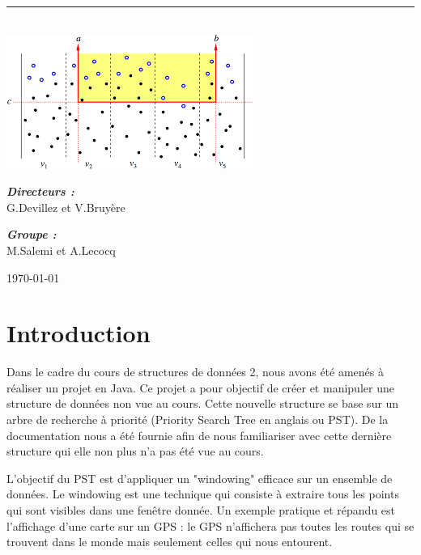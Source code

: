 \documentclass[10pt,a4paper]{article}
\newcommand{\HRule}{\rule{\linewidth}{0.5mm}}
\begin{document}
\begin{titlepage}
\begin{sffamily}
\begin{center}
    \HRule \\[2cm]
    \includegraphics[scale=0.50]{images/window.png}
    \\[2cm]

    \begin{minipage}{0.4\textwidth}
      \begin{flushleft} \large
        \emph{\textbf{Directeurs :}}\\ G.Devillez et V.Bruyère\\
      \end{flushleft}
    \end{minipage}
    \begin{minipage}{0.4\textwidth}
      \begin{flushright} \large
        \emph{\textbf{Groupe :}}\\ M.Salemi et A.Lecocq
      \end{flushright}
    \end{minipage}

    \vfill

    {\large \today}

  \end{center}
  \end{sffamily}
\end{titlepage}

\newpage
\tableofcontents
\newpage
\section{Introduction}
Dans le cadre du cours de structures de données 2, nous avons été amenés à réaliser un projet en Java. Ce projet a pour objectif de créer et manipuler une structure de données non vue au cours. Cette nouvelle structure se base sur un arbre de recherche à priorité (Priority Search Tree en anglais ou PST). De la documentation nous a été fournie afin de nous familiariser avec cette dernière structure qui elle non plus n'a pas été vue au cours.

L'objectif du PST est d'appliquer un "windowing" efficace sur un ensemble de données. Le windowing est une technique qui consiste à extraire tous les points qui sont visibles dans une fenêtre donnée. Un exemple pratique et répandu est l'affichage d'une carte sur un GPS : le GPS n'affichera pas toutes les routes qui se trouvent dans le monde mais seulement celles qui nous entourent.
\end{document}
